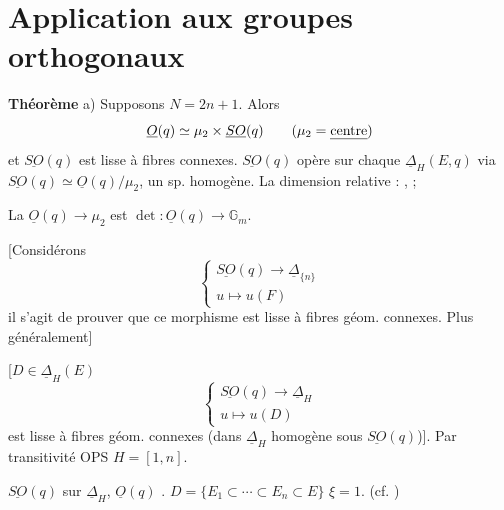 \documentclass[11pt,a4paper]{article}
\begin{document}
\section*{Application aux groupes orthogonaux}

\textbf{Théorème} a) Supposons $N=2n+1$. Alors
\[
\underline{O}(q) \simeq \mu_2\times\underline{SO}(q) \qquad (\mu_2 = \text{\uncertain{centre}})
\]
et $\underline{SO}(q)$ est lisse à fibres connexes.
 $\underline{SO}(q)$ opère sur chaque
$\underline{\Delta}_H(E,q)$ via $\underline{SO}(q)\simeq\underline{O}(q)/\mu_2$,
 un sp. homogène.
La dimension relative \ill{} \ill{} \ill{}  \ill{} :
\ill{} \ill{} \ill{} \ill{}  ,
\ill{} \ill{} \struck{\ill{}} ;

 La  $\underline{O}(q)\to\mu_2$ est
 $\det : \underline{O}(q)\to\mathbb{G}_m$.


[Considérons
\[
\begin{cases}
\underline{SO}(q) \longrightarrow \underline{\Delta}_{\{n\}} \\
u \longmapsto u(F)
\end{cases}
\]
il s'agit de prouver que ce morphisme est lisse à fibres géom. connexes. Plus
généralement] 

[$D\in\underline{\Delta}_H(E)$
\[
\begin{cases}
\underline{SO}(q) \longrightarrow \underline{\Delta}_H \\
u \longmapsto u(D)
\end{cases}
\]
est lisse à fibres géom. connexes (dans $\underline{\Delta}_H$ 
homogène sous $\underline{SO}(q)$)]. Par transitivité OPS $H=[1,n]$.

 $\underline{SO}(q)$ \struck{\ill{}} 
sur $\underline{\Delta}_H$, $\underline{O}(q)$ \ill{} \ill{}.
\struck{\ill{}}\; $D=\{E_1\subset\cdots\subset E_n\subset E\}$ \ill{} $\xi=1$.
(cf. \ill{} \ill{} \ill{})
\end{document}
